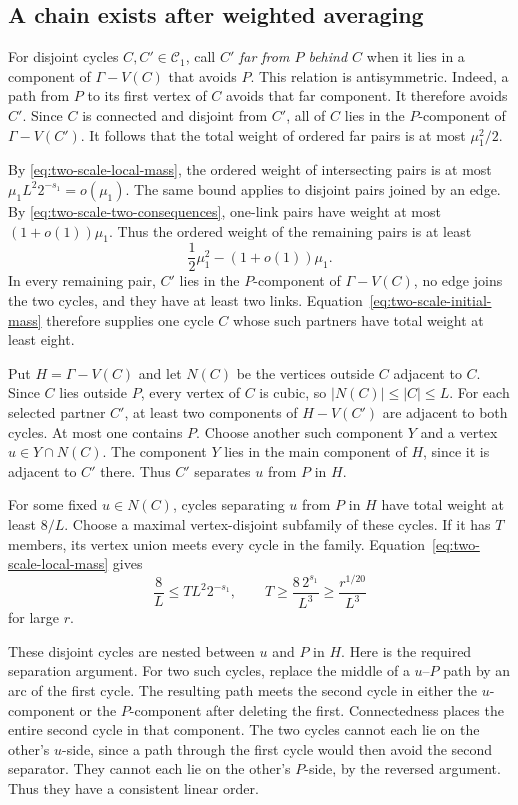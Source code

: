 \subsection{A chain exists after weighted averaging}

For disjoint cycles $C,C'\in\mathcal C_1$, call $C'$ \emph{far from $P$ behind $C$}
when it lies in a component of $\Gamma-V(C)$ that avoids $P$.
This relation is antisymmetric.
Indeed, a path from $P$ to its first vertex of $C$ avoids that far component.
It therefore avoids $C'$.
Since $C$ is connected and disjoint from $C'$, all of $C$ lies in the $P$-component of $\Gamma-V(C')$.
It follows that the total weight of ordered far pairs is at most $\mu_1^2/2$.

By \eqref{eq:two-scale-local-mass}, the ordered weight of intersecting pairs is at most
$\mu_1L^2 2^{-s_1}=o(\mu_1)$.
The same bound applies to disjoint pairs joined by an edge.
By \eqref{eq:two-scale-two-consequences}, one-link pairs have weight at most $(1+o(1))\mu_1$.
Thus the ordered weight of the remaining pairs is at least
\[
 \frac12\mu_1^2-(1+o(1))\mu_1.
\]
In every remaining pair, $C'$ lies in the $P$-component of $\Gamma-V(C)$,
no edge joins the two cycles, and they have at least two links.
Equation~\eqref{eq:two-scale-initial-mass} therefore supplies one cycle $C$ whose such partners have total weight at least eight.

Put $H=\Gamma-V(C)$ and let $N(C)$ be the vertices outside $C$ adjacent to $C$.
Since $C$ lies outside $P$, every vertex of $C$ is cubic, so $|N(C)|\le|C|\le L$.
For each selected partner $C'$, at least two components of $H-V(C')$ are adjacent to both cycles.
At most one contains $P$.
Choose another such component $Y$ and a vertex $u\in Y\cap N(C)$.
The component $Y$ lies in the main component of $H$, since it is adjacent to $C'$ there.
Thus $C'$ separates $u$ from $P$ in $H$.

For some fixed $u\in N(C)$, cycles separating $u$ from $P$ in $H$ have total weight at least $8/L$.
Choose a maximal vertex-disjoint subfamily of these cycles.
If it has $T$ members, its vertex union meets every cycle in the family.
Equation~\eqref{eq:two-scale-local-mass} gives
\[
 \frac8L\le TL^2 2^{-s_1},\qquad
 T\ge\frac{8\,2^{s_1}}{L^3}
 \ge\frac{r^{1/20}}{L^3}
\]
for large $r$.

These disjoint cycles are nested between $u$ and $P$ in $H$.
Here is the required separation argument.
For two such cycles, replace the middle of a $u$--$P$ path by an arc of the first cycle.
The resulting path meets the second cycle in either the $u$-component or the $P$-component after deleting the first.
Connectedness places the entire second cycle in that component.
The two cycles cannot each lie on the other's $u$-side, since a path through the first cycle would then avoid the second separator.
They cannot each lie on the other's $P$-side, by the reversed argument.
Thus they have a consistent linear order.

